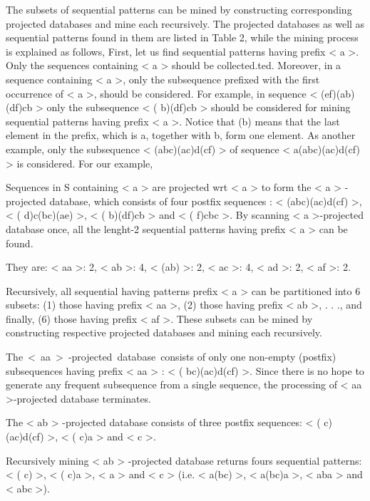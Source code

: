 \documentclass[12pt]{article}
\renewcommand{\_}{\kern-1.5pt\textunderscore\kern-1.5pt}
\begin{document}
The subsets of sequential patterns can be mined by constructing corresponding projected databases and mine each recursively. The projected databases as well as sequential patterns found in them are listed in Table 2, while the mining process is explained as follows, First, let us find sequential patterns having prefix < a >. Only the sequences containing < a > should be collected.ted. Moreover, in a sequence containing < a >, only the subsequence prefixed with the first occurrence of < a >, should be considered. For example, in sequence < (ef)(ab)(df)cb > only the subsequence < ( b)(df)cb > should be considered for mining sequential patterns having prefix < a >. Notice that (b) means that the last element in the prefix, which is a, together with b, form one element. As another example, only the subsequence < (abc)(ac)d(cf) > of sequence < a(abc)(ac)d(cf) > is considered. For our example,\par

Sequences in S containing < a > are projected wrt < a > to form the < a > - projected database, which consists of four postfix sequences : < (abc)(ac)d(cf) >, < ( d)c(bc)(ae) >, < ( b)(df)cb > and < ( f)cbc >. By scanning < a >-projected database once, all the lenght-2 sequential patterns having prefix < a > can be found.\par

They are: < aa >: 2, < ab >: 4, < (ab) >: 2, < ac >: 4, < ad >: 2, < af >: 2.\par

Recursively, all sequential having patterns prefix < a > can be partitioned into 6 subsets: (1) those having prefix < aa >, (2) those having prefix < ab >, . . ., and finally, (6) those having prefix < af >. These subsets can be mined by constructing respective projected databases and mining each recursively.\par

The\ <\ aa\ >\ -projected\ database\ consists of only one non-empty (postfix) subsequences having prefix       < aa > : < ( bc)(ac)d(cf) >. Since there is no hope to generate any frequent subsequence from a single sequence, the processing of < aa >-projected database terminates.\par

The < ab > -projected database consists of three postfix sequences: < ( c)(ac)d(cf) >, < ( c)a > and < c >.\par

Recursively mining < ab > -projected database returns fours sequential patterns: < ( c) >, < ( c)a >, < a > and < c > (i.e. < a(bc) >, < a(bc)a >, < aba > and < abc >).\par
\end{document}
